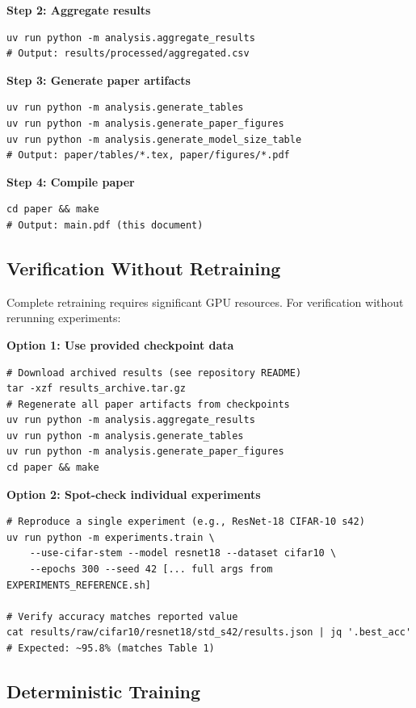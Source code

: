 \textbf{Step 2: Aggregate results}
\begin{verbatim}
uv run python -m analysis.aggregate_results
# Output: results/processed/aggregated.csv
\end{verbatim}

\textbf{Step 3: Generate paper artifacts}
\begin{verbatim}
uv run python -m analysis.generate_tables
uv run python -m analysis.generate_paper_figures
uv run python -m analysis.generate_model_size_table
# Output: paper/tables/*.tex, paper/figures/*.pdf
\end{verbatim}

\textbf{Step 4: Compile paper}
\begin{verbatim}
cd paper && make
# Output: main.pdf (this document)
\end{verbatim}

\subsection{Verification Without Retraining}

Complete retraining requires significant GPU resources. For verification without rerunning experiments:

\textbf{Option 1: Use provided checkpoint data}
\begin{verbatim}
# Download archived results (see repository README)
tar -xzf results_archive.tar.gz
# Regenerate all paper artifacts from checkpoints
uv run python -m analysis.aggregate_results
uv run python -m analysis.generate_tables
uv run python -m analysis.generate_paper_figures
cd paper && make
\end{verbatim}

\textbf{Option 2: Spot-check individual experiments}
\begin{verbatim}
# Reproduce a single experiment (e.g., ResNet-18 CIFAR-10 s42)
uv run python -m experiments.train \
    --use-cifar-stem --model resnet18 --dataset cifar10 \
    --epochs 300 --seed 42 [... full args from EXPERIMENTS_REFERENCE.sh]

# Verify accuracy matches reported value
cat results/raw/cifar10/resnet18/std_s42/results.json | jq '.best_acc'
# Expected: ~95.8% (matches Table 1)
\end{verbatim}

\subsection{Deterministic Training}

